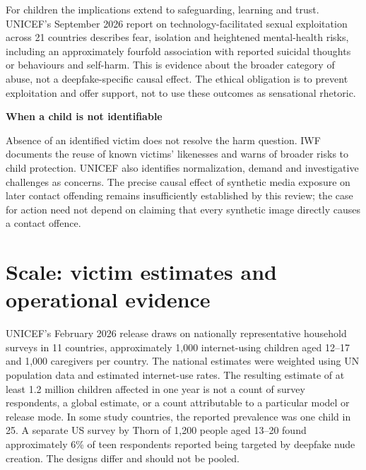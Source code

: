 \documentclass[10pt,a4paper]{article}
\newcommand{\sub}[1]{\vspace{1mm}\textbf{#1}\par}
\begin{document}
For children the implications extend to safeguarding, learning and trust. UNICEF's September 2026 report on technology-facilitated sexual exploitation across 21 countries describes fear, isolation and heightened mental-health risks, including an approximately fourfold association with reported suicidal thoughts or behaviours and self-harm. This is evidence about the broader category of abuse, not a deepfake-specific causal effect. The ethical obligation is to prevent exploitation and offer support, not to use these outcomes as sensational rhetoric. \cite{unicefwide}

\sub{When a child is not identifiable}
Absence of an identified victim does not resolve the harm question. IWF documents the reuse of known victims' likenesses and warns of broader risks to child protection. UNICEF also identifies normalization, demand and investigative challenges as concerns. The precise causal effect of synthetic media exposure on later contact offending remains insufficiently established by this review; the case for action need not depend on claiming that every synthetic image directly causes a contact offence. \cite{iwf,unicef12}

\section{Scale: victim estimates and operational evidence}
UNICEF's February 2026 release draws on nationally representative household surveys in 11 countries, approximately 1,000 internet-using children aged 12--17 and 1,000 caregivers per country. The national estimates were weighted using UN population data and estimated internet-use rates. The resulting estimate of at least 1.2 million children affected in one year is not a count of survey respondents, a global estimate, or a count attributable to a particular model or release mode. In some study countries, the reported prevalence was one child in 25. A separate US survey by Thorn of 1,200 people aged 13--20 found approximately 6\% of teen respondents reported being targeted by deepfake nude creation. The designs differ and should not be pooled. \cite{unicef12,thorn}
\end{document}
